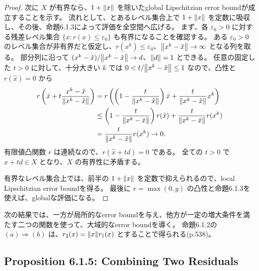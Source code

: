 \documentclass[12pt,dvipdfmx]{article}
\theoremstyle{plain}
\begin{document}
\begin{proof}
    次に $X$ が有界なら、$1 + \norm{x}$ を除いたglobal Lipschitzian error boundが成立することを示す。
    流れとして、とあるレベル集合上で $1 + \norm{x}$ を定数に吸収し、その後、命題6.1.3によって評価を全空間へ広げる。
    まず、各 $\varepsilon_0 > 0$ に対する残差レベル集合 $\{x : r(x) \leq \varepsilon_0\}$ も有界になることを確認する。
    ある $\varepsilon_0 > 0$ のレベル集合が非有界だと仮定し、$r(x^k) \leq \varepsilon_0$、$\norm{x^k - \hat x} \to \infty$ となる列を取る。
    部分列に沿って $(x^k - \hat x)/\norm{x^k - \hat x} \to d$、$\norm{d} = 1$ とできる。
    任意の固定した $t > 0$ に対して、十分大きい $k$ では $0 < t/\norm{x^k - \hat x} \leq 1$ なので、凸性と $r(\hat x) = 0$ から
    \begin{align*}
        r\left(\hat x + t\frac{x^k - \hat x}{\norm{x^k - \hat x}}\right)
        &= r\left(\left(1 - \frac{t}{\norm{x^k - \hat x}}\right)\hat x
        + \frac{t}{\norm{x^k - \hat x}}x^k\right)\\
        &\leq \left(1 - \frac{t}{\norm{x^k - \hat x}}\right)r(\hat x)
        + \frac{t}{\norm{x^k - \hat x}}r(x^k)\\
        &= \frac{t}{\norm{x^k - \hat x}} r(x^k) \to 0.
    \end{align*}
    有限値凸関数 $r$ は連続なので、$r(\hat x + td) = 0$ である。
    全ての $t > 0$ で $\hat x + td \in X$ となり、$X$ の有界性に矛盾する。

    有界なレベル集合上では、前半の $1 + \norm{x}$ を定数で抑えられるので、local Lipschitzian error boundを得る。
    最後に $r = \max(0, g)$ の凸性と命題6.1.3を使えば、globalな評価になる。
\end{proof}

次の結果では、一方が局所的なerror boundを与え、他方が一定の増大条件を満たす二つの関数を使って、大域的なerror boundを導く。
命題6.1.2の $(a) \Rightarrow (b)$ は、$r_2(x) = \norm{x}r_1(x)$ とすることで得られる(p.538)。

\subsection{Proposition 6.1.5: Combining Two Residuals}
\label{sec:error-composite}

\end{document}
